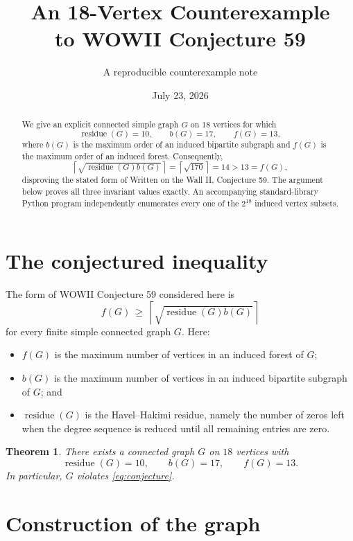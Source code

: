 \documentclass[11pt]{article}
\title{\textbf{An 18-Vertex Counterexample\\to WOWII Conjecture 59}}
\author{A reproducible counterexample note}
\date{July 23, 2026}
\newtheorem{theorem}{Theorem}
\newcommand{\res}{\operatorname{residue}}
\newcommand{\ceil}[1]{\left\lceil #1 \right\rceil}
\begin{document}
\maketitle

\begin{abstract}
We give an explicit connected simple graph $G$ on $18$ vertices for which
\[
  \res(G)=10,\qquad b(G)=17,\qquad f(G)=13,
\]
where $b(G)$ is the maximum order of an induced bipartite subgraph and $f(G)$
is the maximum order of an induced forest. Consequently,
\[
  \ceil{\sqrt{\res(G)b(G)}}=\ceil{\sqrt{170}}=14>13=f(G),
\]
disproving the stated form of Written on the Wall II, Conjecture 59. The
argument below proves all three invariant values exactly. An accompanying
standard-library Python program independently enumerates every one of the
$2^{18}$ induced vertex subsets.
\end{abstract}

\section{The conjectured inequality}

The form of WOWII Conjecture 59 considered here is
\begin{equation}\label{eq:conjecture}
  f(G)\ \ge\ \ceil{\sqrt{\res(G)b(G)}}
\end{equation}
for every finite simple connected graph $G$. Here:
\begin{itemize}[leftmargin=2em]
  \item $f(G)$ is the maximum number of vertices in an induced forest of $G$;
  \item $b(G)$ is the maximum number of vertices in an induced bipartite
        subgraph of $G$; and
  \item $\res(G)$ is the Havel--Hakimi residue, namely the number of zeros
        left when the degree sequence is reduced until all remaining entries
        are zero.
\end{itemize}

\begin{theorem}\label{thm:main}
There exists a connected graph $G$ on $18$ vertices with
\[
\res(G)=10,\qquad b(G)=17,\qquad f(G)=13.
\]
In particular, $G$ violates \eqref{eq:conjecture}.
\end{theorem}

\section{Construction of the graph}
\end{document}
